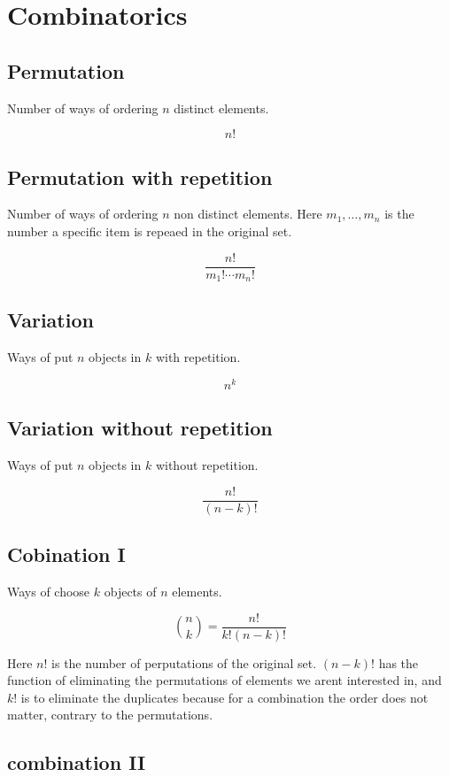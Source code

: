 \section{Combinatorics}

\subsection{Permutation}

Number of ways of ordering \(n\) distinct elements.

\[n!\]

\subsection{Permutation with repetition}

Number of ways of ordering \(n\) non distinct elements. Here \(m_1, \dots, m_n\)
is the number a specific item is repeaed in the original set.

\[\frac{n!}{m_1! \cdots m_n!}\]

\subsection{Variation}

Ways of put \(n\) objects in \(k\) with repetition.

\[n^k\]

\subsection{Variation without repetition}

Ways of put \(n\) objects in \(k\) without repetition.

\[\frac{n!}{(n -k)!}\]

\subsection{Cobination I}

Ways of choose \(k\) objects of \(n\) elements.

\[\binom{n}{k} = \frac{n!}{k!(n-k)!}\]

Here \(n!\) is the number of perputations of the original set.
\((n-k)!\) has the function of eliminating the permutations of elements we arent interested in, and
\(k!\) is to eliminate the duplicates because for a combination the order does not matter, contrary to
the permutations.

\subsection{combination II}

